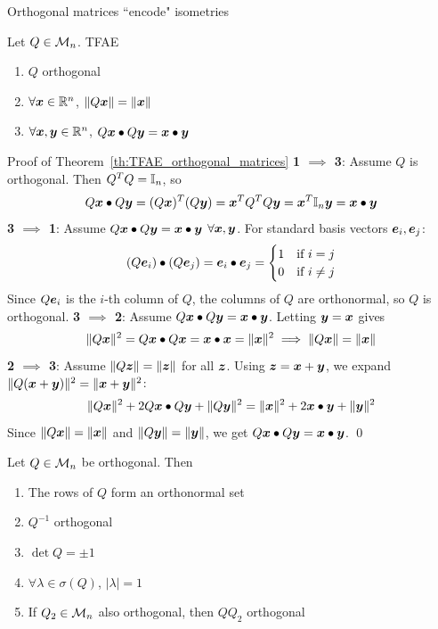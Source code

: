 \documentclass[aspectratio=169]{beamer}\usepackage[]{graphicx}\usepackage[]{xcolor}
\begin{document}
\begin{frame}{Orthogonal matrices ``encode" isometries}
\begin{theorem}
\label{th:TFAE_orthogonal_matrices}
Let $Q\in\mathcal{M}_n$. TFAE
\begin{enumerate}
\item $Q$ orthogonal
\item $\forall\bm{x}\in\mathbb{R}^n$, $\|Q\bm{x}\|=\|\bm{x}\|$
\item $\forall\bm{x},\bm{y}\in\mathbb{R}^n$, $Q\bm{x}\bullet Q\bm{y}=\bm{x}\bullet\bm{y}$
\end{enumerate}
\end{theorem}
\end{frame}



\begin{frame}{Proof of Theorem~\ref{th:TFAE_orthogonal_matrices}}
\textbf{1 $\implies$ 3}: Assume $Q$ is orthogonal. Then $Q^TQ=\mathbb{I}_n$, so
\[
Q\bm{x} \bullet Q\bm{y} = (Q\bm{x})^T(Q\bm{y}) = \bm{x}^TQ^TQ\bm{y} = \bm{x}^T\mathbb{I}_n\bm{y} = \bm{x}\bullet\bm{y}
\]
\vfill
\textbf{3 $\implies$ 1}: Assume $Q\bm{x}\bullet Q\bm{y}=\bm{x}\bullet\bm{y}$ $\forall\bm{x},\bm{y}$. For standard basis vectors $\bm{e}_i, \bm{e}_j$:
\[
(Q\bm{e}_i)\bullet(Q\bm{e}_j) = \bm{e}_i\bullet\bm{e}_j = \begin{cases} 1 & \text{if } i=j \\ 0 & \text{if } i\neq j \end{cases}
\]
Since $Q\bm{e}_i$ is the $i$-th column of $Q$, the columns of $Q$ are orthonormal, so $Q$ is orthogonal.
\vfill
\textbf{3 $\implies$ 2}: Assume $Q\bm{x}\bullet Q\bm{y}=\bm{x}\bullet\bm{y}$. Letting $\bm{y}=\bm{x}$ gives
\[
\|Q\bm{x}\|^2 = Q\bm{x}\bullet Q\bm{x} = \bm{x}\bullet\bm{x} = \|\bm{x}\|^2 \implies \|Q\bm{x}\| = \|\bm{x}\|
\]
\vfill
\textbf{2 $\implies$ 3}: Assume $\|Q\bm{z}\|=\|\bm{z}\|$ for all $\bm{z}$. Using $\bm{z}=\bm{x}+\bm{y}$, we expand $\|Q(\bm{x}+\bm{y})\|^2 = \|\bm{x}+\bm{y}\|^2$:
\[
\|Q\bm{x}\|^2 + 2Q\bm{x}\bullet Q\bm{y} + \|Q\bm{y}\|^2 = \|\bm{x}\|^2 + 2\bm{x}\bullet\bm{y} + \|\bm{y}\|^2
\]
Since $\|Q\bm{x}\|=\|\bm{x}\|$ and $\|Q\bm{y}\|=\|\bm{y}\|$, we get $Q\bm{x}\bullet Q\bm{y} = \bm{x}\bullet\bm{y}$. \hfill\qed
\end{frame}



\begin{frame}
\begin{importanttheorem}\label{th:properties_orthogonal_matrices}
Let $Q\in\mathcal{M}_n$ be orthogonal. Then
\begin{enumerate}
\item The rows of $Q$ form an orthonormal set
\item $Q^{-1}$ orthogonal
\item $\det Q=\pm 1$
\item $\forall\lambda\in\sigma(Q)$, $|\lambda|=1$
\item If $Q_2\in\mathcal{M}_n$ also orthogonal, then $QQ_2$ orthogonal
\end{enumerate}
\end{importanttheorem}
\end{frame}
\end{document}
